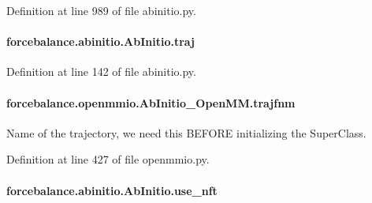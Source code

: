 Definition at line 989 of file abinitio.\-py.

\hypertarget{classforcebalance_1_1abinitio_1_1AbInitio_a7b52d5101bfa4fde7129c84c0558ad14}{
\paragraph[{traj}]{\setlength{\rightskip}{0pt plus 5cm}forcebalance.\-abinitio.\-Ab\-Initio.\-traj\hspace{0.3cm}{\ttfamily [inherited]}}}\label{classforcebalance_1_1abinitio_1_1AbInitio_a7b52d5101bfa4fde7129c84c0558ad14}


Definition at line 142 of file abinitio.\-py.

\hypertarget{classforcebalance_1_1openmmio_1_1AbInitio__OpenMM_abcf5ab6d976ea05c774b8c18b5262b68}{
\paragraph[{trajfnm}]{\setlength{\rightskip}{0pt plus 5cm}forcebalance.\-openmmio.\-Ab\-Initio\-\_\-\-Open\-M\-M.\-trajfnm}}\label{classforcebalance_1_1openmmio_1_1AbInitio__OpenMM_abcf5ab6d976ea05c774b8c18b5262b68}


Name of the trajectory, we need this B\-E\-F\-O\-R\-E initializing the Super\-Class. 



Definition at line 427 of file openmmio.\-py.

\hypertarget{classforcebalance_1_1abinitio_1_1AbInitio_afd8d179560a295ffa6c6309843c59279}{
\paragraph[{use\-\_\-nft}]{\setlength{\rightskip}{0pt plus 5cm}forcebalance.\-abinitio.\-Ab\-Initio.\-use\-\_\-nft\hspace{0.3cm}{\ttfamily [inherited]}}}\label{classforcebalance_1_1abinitio_1_1AbInitio_afd8d179560a295ffa6c6309843c59279}


